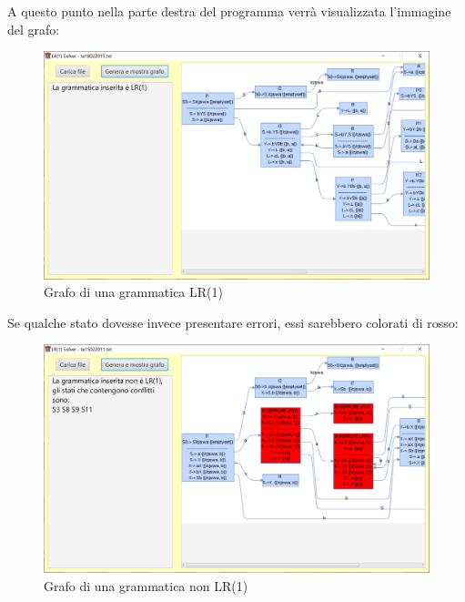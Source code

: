 \documentclass[12pt]{article}
\begin{document}
A questo punto nella parte destra del programma verrà visualizzata l'immagine del grafo:
\begin{figure}[h!]
\centering
\includegraphics[scale=0.5]{immagini/GrammaticaLR1Immagine.png}
\caption{Grafo di una grammatica LR(1)}
\end{figure}
\pagebreak

Se qualche stato dovesse invece presentare errori, essi sarebbero colorati di rosso:
\begin{figure}[h!]
\centering
\includegraphics[scale=0.5]{immagini/GrammaticaNoLR1Immagine.png}
\caption{Grafo di una grammatica non LR(1)}
\end{figure}
\end{document}

